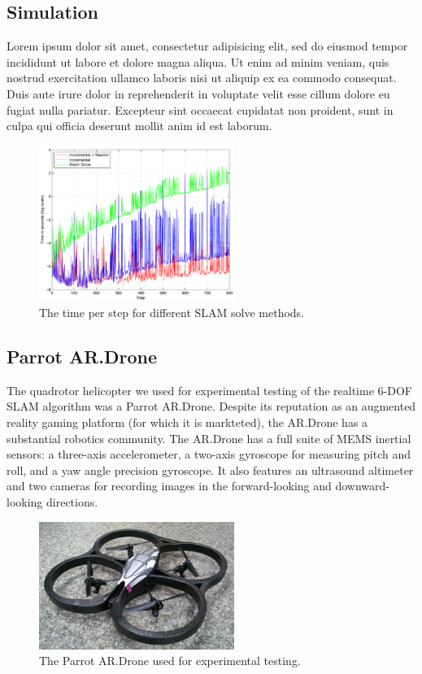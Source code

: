 \documentclass[conference]{IEEEtran}
\begin{document}
\subsection{Simulation}
\label{sub:simulation}


Lorem ipsum dolor sit amet, consectetur adipisicing elit, sed do eiusmod tempor incididunt
ut labore et dolore magna aliqua. Ut enim ad minim veniam, quis nostrud exercitation
ullamco laboris nisi ut aliquip ex ea commodo consequat. Duis aute irure dolor in
reprehenderit in voluptate velit esse cillum dolore eu fugiat nulla pariatur. Excepteur
sint occaecat cupidatat non proident, sunt in culpa qui officia deserunt mollit anim id
est laborum.

\begin{figure}[!t]
  \centering
  \includegraphics[width=2.5in]{images/stepTimeResults}
  \caption{The time per step for different SLAM solve methods.}
  \label{fig:stepTime}
\end{figure}

\subsection{Parrot AR.Drone}
\label{sub:quadrotor}


The quadrotor helicopter we used for experimental testing of the realtime 6-DOF SLAM algorithm
was a Parrot AR.Drone. Despite its reputation as an augmented reality gaming platform (for which
it is markteted), the AR.Drone has a substantial robotics community. The AR.Drone has a full 
suite of MEMS inertial sensors: a three-axis accelerometer, a two-axis gyroscope for measuring 
pitch and roll, and a yaw angle precision gyroscope.  It also features an ultrasound altimeter
and two cameras for recording images in the forward-looking and downward-looking directions.

\begin{figure}[!h]
  \centering
  \includegraphics[width=2.5in]{images/drone1}
  \caption{The Parrot AR.Drone used for experimental testing.}
  \label{fig:drone}
\end{figure}
\end{document}

